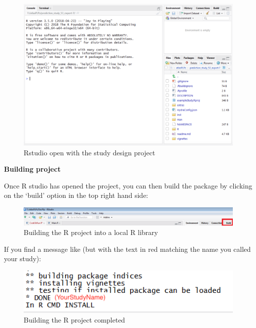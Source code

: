 \documentclass[11pt]{book}
\theoremstyle{definition}
\theoremstyle{definition}
\theoremstyle{definition}
\theoremstyle{remark}
\begin{document}
\begin{figure}
\includegraphics[width=1\linewidth]{images/PatientLevelPrediction/atlasImplementation/rstudio_start} \caption{Rstudio open with the study design project}\label{fig:figureU12}
\end{figure}

\textbf{Building project}

Once R studio has opened the project, you can then build the package by clicking on the `build' option in the top right hand side:

\begin{figure}
\includegraphics[width=1\linewidth]{images/PatientLevelPrediction/atlasImplementation/building} \caption{Building the R project into a local R library}\label{fig:figureU13}
\end{figure}

If you find a message like (but with the text in red matching the name you called your study):

\begin{figure}
\includegraphics[width=1\linewidth]{images/PatientLevelPrediction/atlasImplementation/buildComplete} \caption{Building the R project completed}\label{fig:figureU14}
\end{figure}
\end{document}
